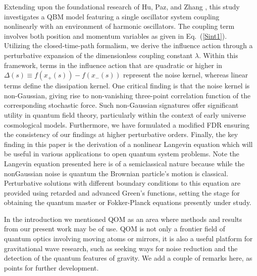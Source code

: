 \documentclass[%
amssymb,preprint,preprintnumbers,nofootinbib,superscriptaddress]{revtex4}
\begin{document}
Extending upon the foundational research of Hu, Paz, and Zhang \cite{HPZ93}, this study investigates a QBM model featuring a single oscillator system coupling nonlinearly with an environment of harmonic oscillators. The coupling term involves both position and momentum variables as given in Eq.~(\ref{Sint1}). Utilizing the closed-time-path formalism, we derive the influence action through a perturbative expansion of the dimensionless coupling constant $\lambda$. Within this framework, terms in the influence action that are quadratic or higher in $\Delta(s)\equiv f(x_{+}(s))-f(x_{-}(s))$ represent the noise kernel, whereas linear terms define the dissipation kernel. One critical finding is that the noise kernel is non-Gaussian, giving rise to non-vanishing three-point correlation function of the corresponding stochastic force. Such non-Gaussian signatures offer significant utility in quantum field theory, particularly within the context of early universe cosmological models. Furthermore, we have formulated a modified FDR ensuring the consistency of our findings at higher perturbative orders. Finally, the key finding in this paper is the derivation of a nonlinear Langevin equation which will be useful in various applications to open quantum system problems.
Note the Langevin equation presented here is of a semiclassical nature because while the nonGaussian noise is quantum the Brownian particle's motion is classical. Perturbative solutions with different boundary conditions to this equation are provided using retarded and advanced Green’s functions, setting the stage for obtaining the quantum master or Fokker-Planck equations presently under study.


In the introduction we mentioned QOM as an area where methods and results from our present work may be of use. QOM is not only a frontier field of quantum optics involving moving atoms or mirrors, it is also a useful platform for gravitational wave research, such as seeking ways for noise reduction and the detection of the quantum features of gravity.  We add a couple of remarks here, as points for further development.
\end{document}

